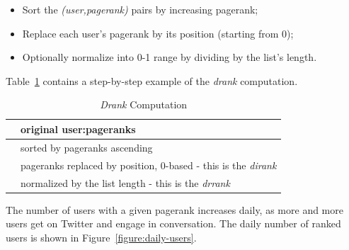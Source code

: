 \documentclass[10pt,oneside]{memoir}
\begin{document}
\begin{itemize}


\item Sort the {\itshape (user,pagerank)} pairs by increasing pagerank;

\item Replace each user's pagerank by its position (starting from 0);

\item Optionally normalize into 0-1 range by dividing by the list's length.
\end{itemize}

Table~\ref{table:drank} contains a step-by-step example of the {\itshape drank} computation.



\begin{table}
    \caption{\emph{Drank} Computation}
    \label{table:drank}

    \centering

    \begin{tabular}{|c|p{2in}|}
    \hline
        [a:0.1 b:0.02 c:0.3 d:0.2] & original user:pageranks\\
    \hline
        [b:0.02 a:0.1 d:0.2 c:0.3] & sorted by pageranks ascending\\
    \hline
        [b:0 a:1 d:2 c:3] & pageranks replaced by position, 0-based - this is the \emph{dirank} \\
    \hline
        [b:0 a:1/4 d:2/4 c:3/4] & normalized by the list length - this is the \emph{drrank} \\
    \hline
    \end{tabular}
\end{table}
The number of users with a given pagerank increases daily, as more and more users get on Twitter and engage in conversation.  The daily number of ranked users is shown in Figure~\ref{figure:daily-users}.



\end{document}

